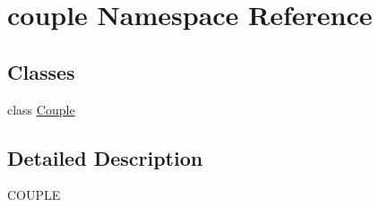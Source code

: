 \hypertarget{namespacecouple}{}\section{couple Namespace Reference}
\label{namespacecouple}
\subsection*{Classes}
\begin{DoxyCompactItemize}
\item 
class \hyperlink{classcouple_1_1_couple}{Couple}
\end{DoxyCompactItemize}


\subsection{Detailed Description}
\begin{DoxyVerb}COUPLE\end{DoxyVerb}
 